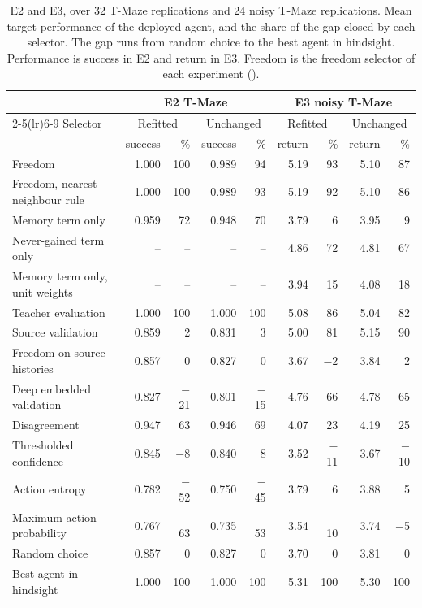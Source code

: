 \begin{table}[t]
\centering
\caption{E2 and E3, over 32 T-Maze replications and 24 noisy T-Maze replications. Mean target performance of the deployed agent, and the share of the gap closed by each selector. The gap runs from random choice to the best agent in hindsight. Performance is success in E2 and return in E3. Freedom is the freedom selector of each experiment ().}
\label{tab:e23}
\small
\setlength{\tabcolsep}{4pt}
\begin{tabular}{@{}lrrrrrrrr@{}}
\toprule
 & \multicolumn{4}{c}{E2 T-Maze} & \multicolumn{4}{c}{E3 noisy T-Maze} \\
\cmidrule(lr){2-5}\cmidrule(lr){6-9}
Selector & \multicolumn{2}{c}{Refitted} & \multicolumn{2}{c}{Unchanged} & \multicolumn{2}{c}{Refitted} & \multicolumn{2}{c}{Unchanged} \\
 & success & \% & success & \% & return & \% & return & \% \\
\midrule
Freedom & 1.000 & 100 & 0.989 & 94 & 5.19 & 93 & 5.10 & 87 \\
Freedom, nearest-neighbour rule & 1.000 & 100 & 0.989 & 93 & 5.19 & 92 & 5.10 & 86 \\
Memory term only & 0.959 & 72 & 0.948 & 70 & 3.79 & 6 & 3.95 & 9 \\
Never-gained term only & -- & -- & -- & -- & 4.86 & 72 & 4.81 & 67 \\
Memory term only, unit weights & -- & -- & -- & -- & 3.94 & 15 & 4.08 & 18 \\
Teacher evaluation & 1.000 & 100 & 1.000 & 100 & 5.08 & 86 & 5.04 & 82 \\
Source validation & 0.859 & 2 & 0.831 & 3 & 5.00 & 81 & 5.15 & 90 \\
Freedom on source histories & 0.857 & 0 & 0.827 & 0 & 3.67 & $-$2 & 3.84 & 2 \\
Deep embedded validation & 0.827 & $-$21 & 0.801 & $-$15 & 4.76 & 66 & 4.78 & 65 \\
Disagreement & 0.947 & 63 & 0.946 & 69 & 4.07 & 23 & 4.19 & 25 \\
Thresholded confidence & 0.845 & $-$8 & 0.840 & 8 & 3.52 & $-$11 & 3.67 & $-$10 \\
Action entropy & 0.782 & $-$52 & 0.750 & $-$45 & 3.79 & 6 & 3.88 & 5 \\
Maximum action probability & 0.767 & $-$63 & 0.735 & $-$53 & 3.54 & $-$10 & 3.74 & $-$5 \\
\midrule
Random choice & 0.857 & 0 & 0.827 & 0 & 3.70 & 0 & 3.81 & 0 \\
Best agent in hindsight & 1.000 & 100 & 1.000 & 100 & 5.31 & 100 & 5.30 & 100 \\
\bottomrule
\end{tabular}
\end{table}
